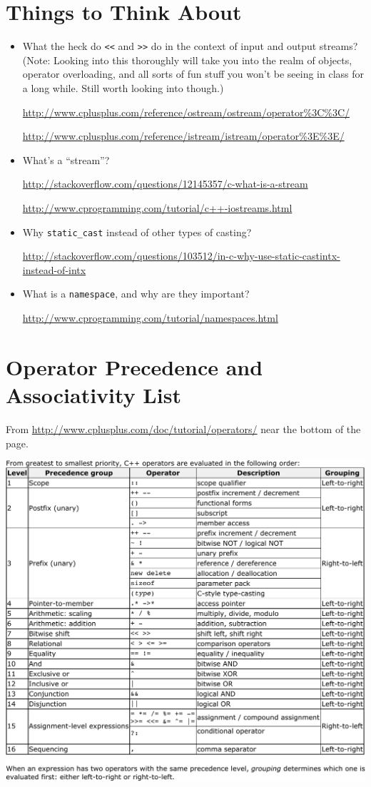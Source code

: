 \documentclass[12pt,letterpaper]{article}
\begin{document}
\section*{Things to Think About}
\begin{itemize}

  \item What the heck do \texttt{<<} and \texttt{>>} do in
    the context of input and output streams?  (Note: Looking into this
    thoroughly will take you into the realm of objects, operator overloading,
    and all sorts of fun stuff you won't be seeing in class for a long while.
    Still worth looking into though.)

    \url{http://www.cplusplus.com/reference/ostream/ostream/operator%3C%3C/}

    \url{http://www.cplusplus.com/reference/istream/istream/operator%3E%3E/}

  \item What's a ``stream''?

    \url{http://stackoverflow.com/questions/12145357/c-what-is-a-stream}

    \url{http://www.cprogramming.com/tutorial/c++-iostreams.html}

  \item Why \texttt{static_cast} instead of other types of casting?

    \url{http://stackoverflow.com/questions/103512/in-c-why-use-static-castintx-instead-of-intx}

  \item What is a \texttt{namespace}, and why are they important?

    \url{http://www.cprogramming.com/tutorial/namespaces.html}

\end{itemize}


\filbreak
\section*{Operator Precedence and Associativity List}
From \url{http://www.cplusplus.com/doc/tutorial/operators/} near the bottom of
the page.

\vspace{5ex}

\includegraphics[width=\textwidth]{cplusplusdotcom--operator-prescedence.pdf}
\end{document}
